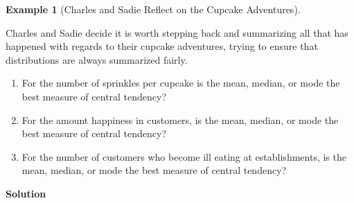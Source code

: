 \documentclass[
  letterpaper,
  DIV=11,
  numbers=noendperiod]{scrreprt}
\providecommand{\tightlist}{%
  \setlength{\itemsep}{0pt}\setlength{\parskip}{0pt}}\usepackage{longtable,booktabs,array}
\theoremstyle{definition}
\theoremstyle{definition}
\newtheorem{example}{Example}[chapter]
\theoremstyle{definition}
\theoremstyle{remark}
\begin{document}
\begin{example}[Charles and Sadie Reflect on the Cupcake
Adventures]\protect\hypertarget{exm-choosing-measure-of-central-tendency}{}\label{exm-choosing-measure-of-central-tendency}

Charles and Sadie decide it is worth stepping back and summarizing all
that has happened with regards to their cupcake adventures, trying to
ensure that distributions are always summarized fairly.

\begin{enumerate}
\def\labelenumi{\alph{enumi}.}
\tightlist
\item
  For the number of sprinkles per cupcake is the mean, median, or mode
  the best measure of central tendency?
\item
  For the amount happiness in customers, is the mean, median, or mode
  the best measure of central tendency?
\item
  For the number of customers who become ill eating at establishments,
  is the mean, median, or mode the best measure of central tendency?
\end{enumerate}

\begin{tcolorbox}[enhanced jigsaw, colback=white, colframe=quarto-callout-color-frame, arc=.35mm, leftrule=.75mm, rightrule=.15mm, opacityback=0, breakable, bottomrule=.15mm, left=2mm, toprule=.15mm]

\vspace{-3mm}\textbf{Solution}\vspace{3mm}


\end{tcolorbox}
\end{example}
\end{document}
